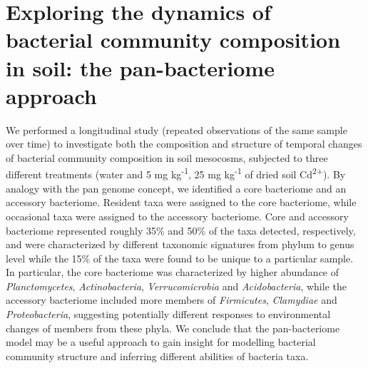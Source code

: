 \section{Exploring the dynamics of bacterial community composition in soil: the pan-bacteriome approach}
We performed a longitudinal study (repeated observations of the same sample over time) to investigate both the composition and structure of temporal changes of bacterial community composition in soil mesocosms, subjected to three different treatments (water and 5 mg kg\textsuperscript{-1}, 25 mg kg\textsuperscript{-1} of dried soil Cd\textsuperscript{2+}). By analogy with the pan genome concept, we identified a core bacteriome and an accessory bacteriome. Resident taxa were assigned to the core bacteriome, while occasional taxa were assigned to the accessory bacteriome. Core and accessory bacteriome represented roughly 35\% and 50\% of the taxa detected, respectively, and were characterized by different taxonomic signatures from phylum to genus level while the 15\% of the taxa were found to be unique to a particular sample. In particular, the core bacteriome was characterized by higher abundance of \textit{Planctomycetes}, \textit{Actinobacteria}, \textit{Verrucomicrobia} and \textit{Acidobacteria}, while the accessory bacteriome included more members of \textit{Firmicutes}, \textit{Clamydiae} and \textit{Proteobacteria}, suggesting potentially different responses to environmental changes of members from these phyla. We conclude that the pan-bacteriome model may be a useful approach to gain insight for modelling bacterial community structure and inferring different abilities of bacteria taxa.\\

